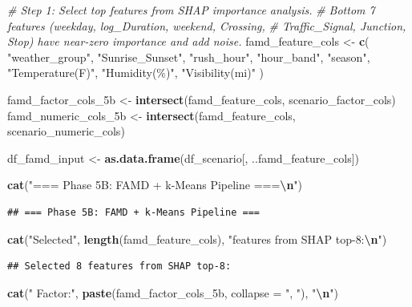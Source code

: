 \documentclass[
]{article}
\newenvironment{Shaded}{\begin{snugshade}}{\end{snugshade}}
\newcommand{\AttributeTok}[1]{\textcolor[rgb]{0.13,0.29,0.53}{#1}}
\newcommand{\CommentTok}[1]{\textcolor[rgb]{0.56,0.35,0.01}{\textit{#1}}}
\newcommand{\FunctionTok}[1]{\textcolor[rgb]{0.13,0.29,0.53}{\textbf{#1}}}
\newcommand{\NormalTok}[1]{#1}
\newcommand{\OtherTok}[1]{\textcolor[rgb]{0.56,0.35,0.01}{#1}}
\newcommand{\SpecialCharTok}[1]{\textcolor[rgb]{0.81,0.36,0.00}{\textbf{#1}}}
\newcommand{\StringTok}[1]{\textcolor[rgb]{0.31,0.60,0.02}{#1}}
\begin{document}
\begin{Shaded}
\begin{Highlighting}[]
\CommentTok{\# Step 1: Select top features from SHAP importance analysis.}
\CommentTok{\# Bottom 7 features (weekday, log\_Duration, weekend, Crossing,}
\CommentTok{\# Traffic\_Signal, Junction, Stop) have near{-}zero importance and add noise.}
\NormalTok{famd\_feature\_cols }\OtherTok{\textless{}{-}} \FunctionTok{c}\NormalTok{(}
  \StringTok{"weather\_group"}\NormalTok{, }\StringTok{"Sunrise\_Sunset"}\NormalTok{, }\StringTok{"rush\_hour"}\NormalTok{, }\StringTok{"hour\_band"}\NormalTok{,}
  \StringTok{"season"}\NormalTok{, }\StringTok{"Temperature(F)"}\NormalTok{, }\StringTok{"Humidity(\%)"}\NormalTok{, }\StringTok{"Visibility(mi)"}
\NormalTok{)}

\NormalTok{famd\_factor\_cols\_5b }\OtherTok{\textless{}{-}} \FunctionTok{intersect}\NormalTok{(famd\_feature\_cols, scenario\_factor\_cols)}
\NormalTok{famd\_numeric\_cols\_5b }\OtherTok{\textless{}{-}} \FunctionTok{intersect}\NormalTok{(famd\_feature\_cols, scenario\_numeric\_cols)}

\NormalTok{df\_famd\_input }\OtherTok{\textless{}{-}} \FunctionTok{as.data.frame}\NormalTok{(df\_scenario[, ..famd\_feature\_cols])}

\FunctionTok{cat}\NormalTok{(}\StringTok{"=== Phase 5B: FAMD + k{-}Means Pipeline ===}\SpecialCharTok{\textbackslash{}n}\StringTok{"}\NormalTok{)}
\end{Highlighting}
\end{Shaded}

\begin{verbatim}
## === Phase 5B: FAMD + k-Means Pipeline ===
\end{verbatim}

\begin{Shaded}
\begin{Highlighting}[]
\FunctionTok{cat}\NormalTok{(}\StringTok{"Selected"}\NormalTok{, }\FunctionTok{length}\NormalTok{(famd\_feature\_cols), }\StringTok{"features from SHAP top{-}8:}\SpecialCharTok{\textbackslash{}n}\StringTok{"}\NormalTok{)}
\end{Highlighting}
\end{Shaded}

\begin{verbatim}
## Selected 8 features from SHAP top-8:
\end{verbatim}

\begin{Shaded}
\begin{Highlighting}[]
\FunctionTok{cat}\NormalTok{(}\StringTok{"  Factor:"}\NormalTok{, }\FunctionTok{paste}\NormalTok{(famd\_factor\_cols\_5b, }\AttributeTok{collapse =} \StringTok{", "}\NormalTok{), }\StringTok{"}\SpecialCharTok{\textbackslash{}n}\StringTok{"}\NormalTok{)}
\end{Highlighting}
\end{Shaded}
\end{document}
